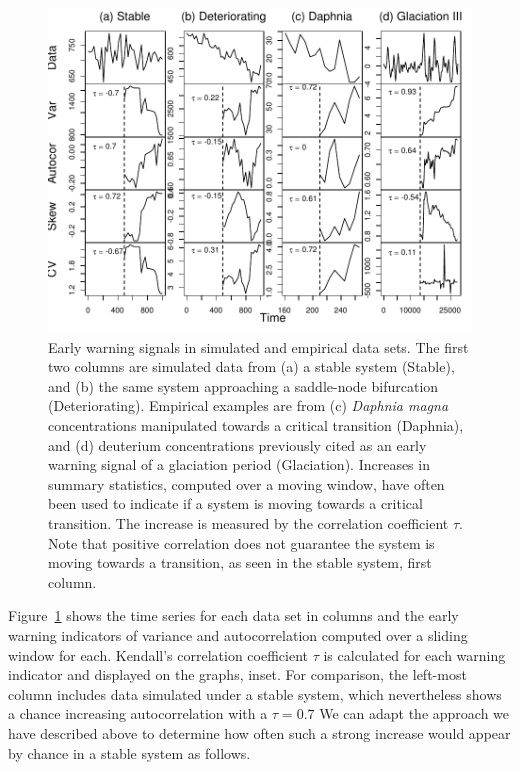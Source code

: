 \documentclass[authoryear,review,11pt]{elsarticle}
\begin{document}
\begin{figure}
   \begin{center}
     \includegraphics[width=\linewidth]{Fig2.pdf}
     \caption{Early warning signals in simulated and empirical data sets.  
     The first two columns are simulated data from (a) a stable system (Stable), 
     and (b) the same system approaching a saddle-node bifurcation (Deteriorating).  
     Empirical examples are from (c) \emph{Daphnia magna} concentrations manipulated towards a critical transition (Daphnia), 
     and (d) deuterium concentrations previously cited as an early warning signal of a glaciation period (Glaciation). 
     Increases in summary statistics, computed over a moving window, 
     have often been used to indicate if a system is moving towards a critical transition.  
     The increase is measured by the correlation coefficient $\tau$.  
     Note that positive correlation does not guarantee the system is moving towards a transition, 
     as seen in the stable system, first column.}
     \label{fig:summary_stats}
  \end{center}
 \end{figure}


Figure~\ref{fig:summary_stats} shows the time series for each data set in columns
and the early warning indicators  of variance and autocorrelation
computed over a sliding window for each.
Kendall's correlation coefficient $\tau$ is calculated for each warning indicator and displayed on the graphs, inset.
For comparison, the left-most column includes data simulated under a stable system,
which nevertheless shows a chance increasing autocorrelation with a $\tau=0.7$
We can adapt the approach we have described above to determine how often such a strong increase would appear
by chance in a stable system as follows.
\end{document}
